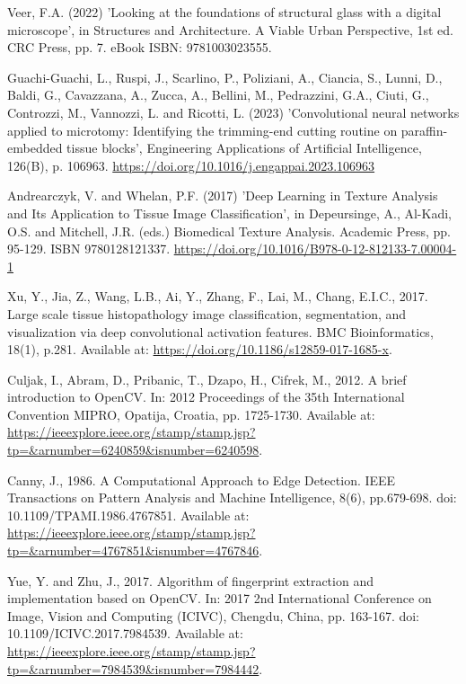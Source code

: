 \begin{thebibliography}{99}
    Veer, F.A. (2022) 'Looking at the foundations of structural glass with a digital microscope', in Structures and Architecture. A Viable Urban Perspective, 1st ed. CRC Press, pp. 7. eBook ISBN: 9781003023555.

    Guachi-Guachi, L., Ruspi, J., Scarlino, P., Poliziani, A., Ciancia, S., Lunni, D., Baldi, G., Cavazzana, A., Zucca, A., Bellini, M., Pedrazzini, G.A., Ciuti, G., Controzzi, M., Vannozzi, L. and Ricotti, L. (2023) 'Convolutional neural networks applied to microtomy: Identifying the trimming-end cutting routine on paraffin-embedded tissue blocks', Engineering Applications of Artificial Intelligence, 126(B), p. 106963. \url{https://doi.org/10.1016/j.engappai.2023.106963}

    Andrearczyk, V. and Whelan, P.F. (2017) 'Deep Learning in Texture Analysis and Its Application to Tissue Image Classification', in Depeursinge, A., Al-Kadi, O.S. and Mitchell, J.R. (eds.) Biomedical Texture Analysis. Academic Press, pp. 95-129. ISBN 9780128121337. \url{https://doi.org/10.1016/B978-0-12-812133-7.00004-1}

    Xu, Y., Jia, Z., Wang, L.B., Ai, Y., Zhang, F., Lai, M., Chang, E.I.C., 2017. Large scale tissue histopathology image classification, segmentation, and visualization via deep convolutional activation features. BMC Bioinformatics, 18(1), p.281. Available at: \url{https://doi.org/10.1186/s12859-017-1685-x}.
    
    Culjak, I., Abram, D., Pribanic, T., Dzapo, H., Cifrek, M., 2012. A brief introduction to OpenCV. In: 2012 Proceedings of the 35th International Convention MIPRO, Opatija, Croatia, pp. 1725-1730. Available at: \url{https://ieeexplore.ieee.org/stamp/stamp.jsp?tp=&arnumber=6240859&isnumber=6240598}.

    Canny, J., 1986. A Computational Approach to Edge Detection. IEEE Transactions on Pattern Analysis and Machine Intelligence, 8(6), pp.679-698. doi: 10.1109/TPAMI.1986.4767851. Available at: \url{https://ieeexplore.ieee.org/stamp/stamp.jsp?tp=&arnumber=4767851&isnumber=4767846}.

    Yue, Y. and Zhu, J., 2017. Algorithm of fingerprint extraction and implementation based on OpenCV. In: 2017 2nd International Conference on Image, Vision and Computing (ICIVC), Chengdu, China, pp. 163-167. doi: 10.1109/ICIVC.2017.7984539. Available at: \url{https://ieeexplore.ieee.org/stamp/stamp.jsp?tp=&arnumber=7984539&isnumber=7984442}.


\end{thebibliography}
